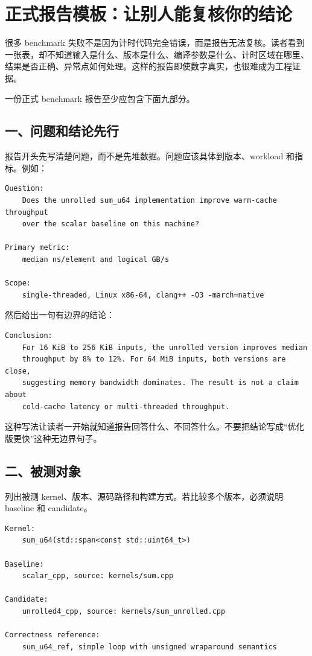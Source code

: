 \section{正式报告模板：让别人能复核你的结论}

很多 benchmark 失败不是因为计时代码完全错误，而是报告无法复核。读者看到一张表，却不知道输入是什么、版本是什么、编译参数是什么、计时区域在哪里、结果是否正确、异常点如何处理。这样的报告即使数字真实，也很难成为工程证据。

一份正式 benchmark 报告至少应包含下面九部分。

\subsection{一、问题和结论先行}

报告开头先写清楚问题，而不是先堆数据。问题应该具体到版本、workload 和指标。例如：

\begin{lstlisting}
Question:
    Does the unrolled sum_u64 implementation improve warm-cache throughput
    over the scalar baseline on this machine?

Primary metric:
    median ns/element and logical GB/s

Scope:
    single-threaded, Linux x86-64, clang++ -O3 -march=native
\end{lstlisting}

然后给出一句有边界的结论：

\begin{lstlisting}
Conclusion:
    For 16 KiB to 256 KiB inputs, the unrolled version improves median
    throughput by 8% to 12%. For 64 MiB inputs, both versions are close,
    suggesting memory bandwidth dominates. The result is not a claim about
    cold-cache latency or multi-threaded throughput.
\end{lstlisting}

这种写法让读者一开始就知道报告回答什么、不回答什么。不要把结论写成“优化版更快”这种无边界句子。

\subsection{二、被测对象}

列出被测 kernel、版本、源码路径和构建方式。若比较多个版本，必须说明 baseline 和 candidate。

\begin{lstlisting}
Kernel:
    sum_u64(std::span<const std::uint64_t>)

Baseline:
    scalar_cpp, source: kernels/sum.cpp

Candidate:
    unrolled4_cpp, source: kernels/sum_unrolled.cpp

Correctness reference:
    sum_u64_ref, simple loop with unsigned wraparound semantics
\end{lstlisting}


